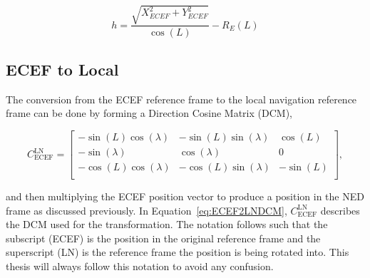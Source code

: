 \documentclass[12pt]{report}
\begin{document}
\begin{equation}\label{eq:ecef2llaaltitude}
  h = \frac{\sqrt{X_{ECEF}^2 + Y^2_{ECEF}}}{\cos\left(L\right)} - R_E (L)
\end{equation}


\subsection{ECEF to Local}
The conversion from the ECEF reference frame to the local navigation reference frame can be done by forming a Direction Cosine Matrix (DCM),

\begin{equation}\label{eq:ECEF2LNDCM}
  C^{\textrm{LN}}_{\textrm{ECEF}} =
  \begin{bmatrix}
    -\sin\left(L\right)\cos\left(\lambda\right) & -\sin\left(L\right)\sin\left(\lambda\right) & \cos\left(L\right)  \\
    -\sin\left(\lambda\right)                   & \cos\left(\lambda\right)                    & 0                   \\
    -\cos\left(L\right)\cos\left(\lambda\right) & -\cos\left(L\right)\sin\left(\lambda\right) & -\sin\left(L\right) \\
  \end{bmatrix},
\end{equation}

and then multiplying the ECEF position vector to produce a position in the NED frame as discussed previously. In Equation~\ref{eq:ECEF2LNDCM}, \(C^{\textrm{LN}}_{\textrm{ECEF}}\) describes the DCM used for the transformation. The notation follows such that the subscript (ECEF) is the position in the original reference frame and the superscript (LN) is the reference frame the position is being rotated into. This thesis will always follow this notation to avoid any confusion.
\end{document}
